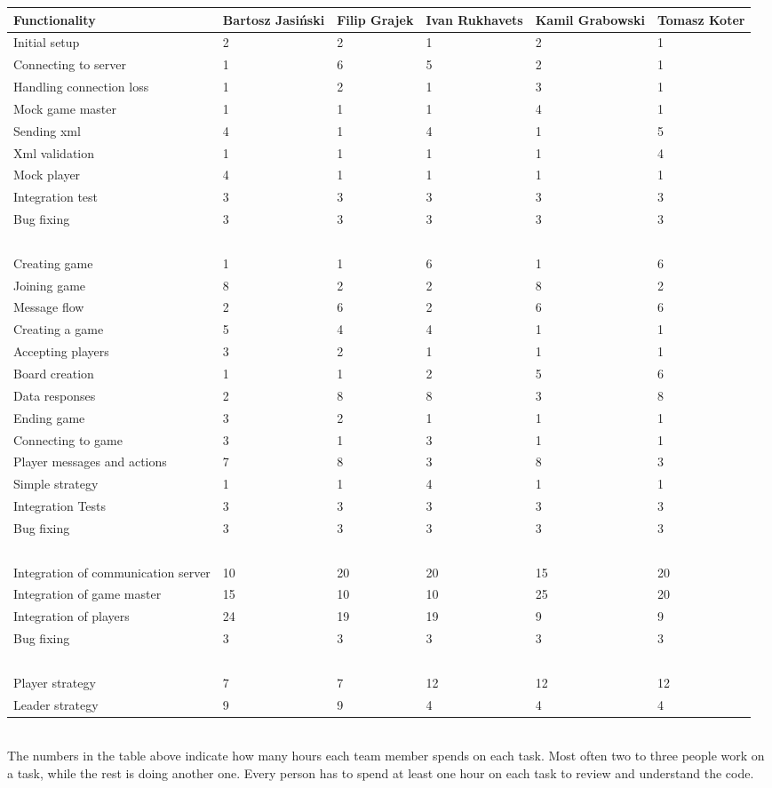 \documentclass[11pt,a4paper]{article}
\begin{document}
\begin{tabular}{ | p{4cm} | p{2cm} | p{2cm} | p{2cm} | p{2cm} | p{2cm} | }
\hline
	\textbf{Functionality} & \textbf{Bartosz Jasiński} & \textbf{Filip Grajek} & \textbf{Ivan Rukhavets} & \textbf{Kamil Grabowski} & \textbf{Tomasz Koter}\\ \hline
	Initial setup & 2 & 2 & 1 & 2 & 1 \\ \hline
	Connecting to server & 1 & 6 & 5 & 2 & 1 \\ \hline
	Handling connection loss & 1 & 2 & 1 & 3 & 1 \\ \hline
	Mock game master & 1 & 1 & 1 & 4 & 1 \\ \hline
	Sending xml & 4 & 1 & 4 & 1 & 5 \\ \hline
	Xml validation & 1 & 1 & 1 & 1 & 4 \\ \hline
	Mock player & 4 & 1 & 1 & 1 & 1 \\ \hline
	Integration test & 3 & 3 & 3 & 3 & 3 \\ \hline
	Bug fixing & 3 & 3 & 3 & 3 & 3 \\ \hline
	\  & \  & \  & \  & \  & \  \\ \hline
	Creating game & 1 & 1 & 6 & 1 & 6 \\ \hline
	Joining game & 8 & 2 & 2 & 8 & 2 \\ \hline
	Message flow & 2 & 6 & 2 & 6 & 6 \\ \hline
	Creating a game & 5 & 4 & 4 & 1 & 1 \\ \hline
	Accepting players & 3 & 2 & 1 & 1 & 1 \\ \hline
	Board creation & 1 & 1 & 2 & 5 & 6 \\ \hline
	Data responses & 2 & 8 & 8 & 3 & 8 \\ \hline
	Ending game & 3 & 2 & 1 & 1 & 1 \\ \hline
	Connecting to game & 3 & 1 & 3 & 1 & 1 \\ \hline
	Player messages and actions & 7 & 8 & 3 & 8 & 3 \\ \hline
	Simple strategy & 1 & 1 & 4 & 1 & 1 \\ \hline
	Integration Tests & 3 & 3 & 3 & 3 & 3 \\ \hline
	Bug fixing & 3 & 3 & 3 & 3 & 3 \\ \hline
	\  & \  & \  & \  & \  & \  \\ \hline
	Integration of communication server & 10 & 20 & 20 & 15 & 20 \\ \hline
	Integration of game master & 15 & 10 & 10 & 25 & 20 \\ \hline
	Integration of players & 24 & 19 & 19 & 9 & 9 \\ \hline
	Bug fixing & 3 & 3 & 3 & 3 & 3 \\ \hline
	\  & \  & \  & \  & \  & \  \\ \hline
	Player strategy & 7 & 7 & 12 & 12 & 12 \\ \hline
	Leader strategy & 9 & 9 & 4 & 4 & 4 \\ \hline
\end{tabular} \\


The numbers in the table above indicate how many hours each team member spends on each task. Most often two to three people work on a task, while the rest is doing another one. Every person has to spend at least one hour on each task to review and understand the code.
\end{document}
